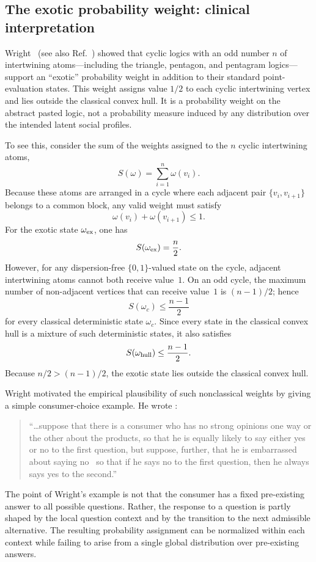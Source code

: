 \documentclass{article}
\begin{document}
\subsection{The exotic probability weight: clinical interpretation}
\label{2026-pliss:exoticProbs}

Wright~\cite{wright:pent} (see also Ref.~\cite[Fig.~V]
{greechie-1974}) showed that cyclic logics with an odd number \(n\)
of intertwining atoms---including the triangle, pentagon, and
pentagram logics---support an ``exotic'' probability weight in
addition to their standard point-evaluation states. This weight
assigns value \(1/2\) to each cyclic intertwining vertex and lies
outside the classical convex hull. It is a probability weight on the
abstract pasted logic, not a probability measure induced by any
distribution over the intended latent social profiles.

To see this, consider the sum of the weights assigned to the \(n\)
cyclic intertwining atoms,
\[
S(\omega)=\sum_{i=1}^n\omega(v_i).
\]
Because these atoms are arranged in a cycle where each adjacent pair
\(\{v_i,v_{i+1}\}\) belongs to a common block, any valid weight must
satisfy
\[
\omega(v_i)+\omega(v_{i+1})\leq 1.
\]
For the exotic state \(\omega_{\rm ex}\), one has
\[
S(\omega_{\rm ex})=\frac n2.
\]
However, for any dispersion-free \(\{0,1\}\)-valued state on the
cycle, adjacent intertwining atoms cannot both receive value~\(1\).
On an odd cycle, the maximum number of non-adjacent vertices that can
receive value~\(1\) is \((n-1)/2\); hence
\[
S(\omega_c)\leq \frac{n-1}{2}
\]
for every classical deterministic state \(\omega_c\). Since every
state in the classical convex hull is a mixture of such deterministic
states, it also satisfies
\[
S(\omega_{\rm hull})\leq \frac{n-1}{2}.
\]
Because \(n/2>(n-1)/2\), the exotic state lies outside the classical
convex hull.

Wright motivated the empirical plausibility of such nonclassical
weights by giving a simple consumer-choice example. He wrote
\cite[p.~272]{wright:pent}:
\begin{quote}
``\dots suppose that there is a consumer who
has no strong opinions one way or the other about the products, so that
he is equally likely to say either yes or no to the first question, but
suppose, further, that he is embarrassed about saying no~\cite{smith1975} so that
if he says no to the first question, then he always says yes to the
second.''
\end{quote}
The point of Wright's example is not that the consumer has a fixed
pre-existing answer to all possible questions. Rather, the response
to a question is partly shaped by the local question context and by
the transition to the next admissible alternative. The resulting
probability assignment can be normalized within each context while
failing to arise from a single global distribution over pre-existing
answers.
\end{document}
